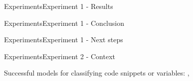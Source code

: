 \documentclass[xcolor=table]{beamer}
\begin{document}
\begin{frame}{Experiments}{Experiment 1 - Results}




\end{frame}

\begin{frame}{Experiments}{Experiment 1 - Conclusion}





\end{frame}

\begin{frame}{Experiments}{Experiment 1 - Next steps}


\end{frame}



\begin{frame}{Experiments}{Experiment 2 - Context}

Successful models for classifying code snippets or variables:  \cite{code2vec} , \cite{139}






\end{frame}
\end{document}
